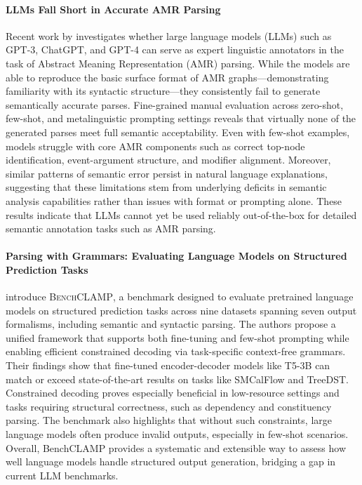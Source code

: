 \paragraph{LLMs Fall Short in Accurate AMR Parsing} 
Recent work by \cite{ettinger2023expert} investigates whether large language models (LLMs) such as GPT-3, ChatGPT, and GPT-4 can serve as expert linguistic annotators in the task of Abstract Meaning Representation (AMR) parsing. While the models are able to reproduce the basic surface format of AMR graphs—demonstrating familiarity with its syntactic structure—they consistently fail to generate semantically accurate parses. Fine-grained manual evaluation across zero-shot, few-shot, and metalinguistic prompting settings reveals that virtually none of the generated parses meet full semantic acceptability. Even with few-shot examples, models struggle with core AMR components such as correct top-node identification, event-argument structure, and modifier alignment. Moreover, similar patterns of semantic error persist in natural language explanations, suggesting that these limitations stem from underlying deficits in semantic analysis capabilities rather than issues with format or prompting alone. These results indicate that LLMs cannot yet be used reliably out-of-the-box for detailed semantic annotation tasks such as AMR parsing.

\paragraph{Parsing with Grammars: Evaluating Language Models on Structured Prediction Tasks}

\citet{bharadwaj2023benchclamp} introduce \textsc{BenchCLAMP}, a benchmark designed to evaluate pretrained language models on structured prediction tasks across nine datasets spanning seven output formalisms, including semantic and syntactic parsing. The authors propose a unified framework that supports both fine-tuning and few-shot prompting while enabling efficient constrained decoding via task-specific context-free grammars. Their findings show that fine-tuned encoder-decoder models like T5-3B can match or exceed state-of-the-art results on tasks like SMCalFlow and TreeDST. Constrained decoding proves especially beneficial in low-resource settings and tasks requiring structural correctness, such as dependency and constituency parsing. The benchmark also highlights that without such constraints, large language models often produce invalid outputs, especially in few-shot scenarios. Overall, BenchCLAMP provides a systematic and extensible way to assess how well language models handle structured output generation, bridging a gap in current LLM benchmarks.

